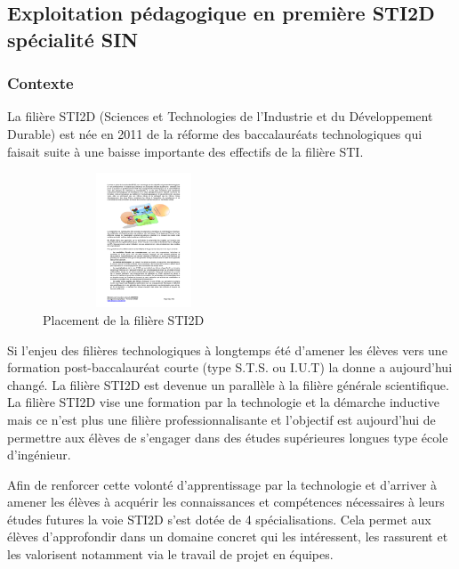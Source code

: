 \documentclass[12pt]{article}
\begin{document}
\subsection{Exploitation pédagogique en première STI2D spécialité SIN}

\subsubsection{Contexte}

La filière STI2D (Sciences et Technologies de l'Industrie et du Développement Durable) est née en 2011 de la réforme des baccalauréats technologiques qui faisait suite à une baisse importante des effectifs de la filière STI.

\begin{figure}
  \vspace{-10pt}
  \hspace{-0pt}
  \begin{center}
    \includegraphics[width=6cm,height=4cm,trim=5cm 17.5cm 4.5cm 6.5cm, clip=true]{Images_Rapport/poursuite_etude}
  \end{center}
  \vspace{-5pt}
  \caption{Placement de la filière STI2D}
  \vspace{-10pt}
\end{figure}
\vspace{20pt}
Si l'enjeu des filières technologiques à longtemps été d'amener les élèves vers une formation post-baccalauréat courte (type S.T.S. ou I.U.T) la donne a aujourd'hui changé. La filière STI2D est devenue un parallèle à la filière générale scientifique. La filière STI2D vise une formation par la technologie et la démarche inductive mais ce n'est plus une filière professionnalisante et l'objectif est aujourd'hui de permettre aux élèves de s'engager dans des études supérieures longues type école d'ingénieur.\par
\vspace{20pt}

Afin de renforcer cette volonté d'apprentissage par la technologie et d'arriver à amener les élèves à acquérir les connaissances et compétences nécessaires à leurs études futures la voie STI2D s'est dotée de 4 spécialisations. Cela permet aux élèves d'approfondir dans un domaine concret qui les intéressent, les rassurent et les valorisent notamment via le travail de projet en équipes.\par
\vspace{20pt}
\end{document}
